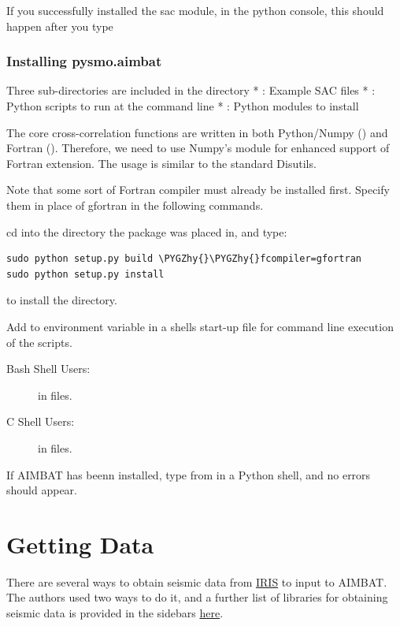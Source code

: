 \documentclass[letterpaper,10pt,english]{sphinxmanual}
\def\PYGZhy{\char`\-}
\begin{document}
If you successfully installed the sac module, in the python console, this should happen after you type 


\subsection{Installing pysmo.aimbat}
\label{docfiles/install_aimbat:installing-pysmo-aimbat}
Three sub-directories are included in the  directory
* : Example SAC files
* : Python scripts to run at the command line
* : Python modules to install

The core cross-correlation functions are written in both Python/Numpy () and Fortran (). Therefore, we need to use Numpy’s  module for enhanced support of Fortran extension. The usage is similar to the standard Disutils.

Note that some sort of Fortran compiler must already be installed first. Specify them in place of gfortran in the following commands.

cd into the directory the  package was placed in, and type:

\begin{Verbatim}[commandchars=\\\{\}]
sudo python setup.py build \PYGZhy{}\PYGZhy{}fcompiler=gfortran
sudo python setup.py install
\end{Verbatim}

to install the  directory.

Add  to environment variable  in a shells start-up file for command line execution of the scripts.
\begin{description}
\item[{Bash Shell Users:}] \leavevmode
{} in  files.

\item[{C Shell Users:}] \leavevmode
{} in  files.

\end{description}

If AIMBAT has beenn installed, type from  in a Python shell, and no errors should appear.


\chapter{Getting Data}
\label{docfiles/gettingData:getting-data}\label{docfiles/gettingData::doc}
There are several ways to obtain seismic data from \href{http://www.iris.edu/dms/nodes/dmc/data/types/waveform-data/}{IRIS} to input to AIMBAT. The authors used two ways to do it, and a further list of libraries for obtaining seismic data is provided in the sidebars \href{http://www.iris.edu/dms/nodes/dmc/data/types/waveform-data/}{here}.
\end{document}
